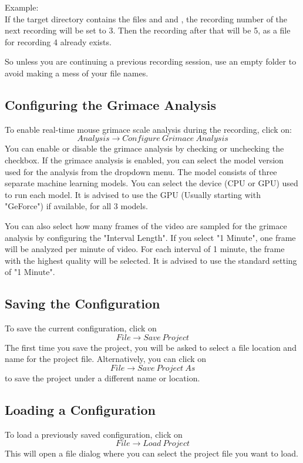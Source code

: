 Example:\\
If the target directory contains the files  and  and , 
the recording number of the next recording will be set to 3. Then the recording after that will be 5, 
as a file for recording 4 already exists.  

So unless you are continuing a previous recording session, 
use an empty folder to avoid making a mess of your file names.

\subsection{Configuring the Grimace Analysis} \label{configuring_the_grimace_analysis}
To enable real-time mouse grimace scale analysis during the recording, 
click on: \[Analysis \rightarrow Configure\ Grimace\ Analysis\] 
You can enable or disable the grimace analysis by checking or unchecking the checkbox.  
If the grimace analysis is enabled, you can select the model version used for the analysis from the dropdown menu.  
The model consists of three separate machine learning models.  
You can select the device (CPU or GPU) used to run each model.
It is advised to use the GPU (Usually starting with "GeForce") if available, for all 3 models.  

You can also select how many frames of the video are sampled for the grimace analysis by configuring the "Interval Length".
If you select "1 Minute", one frame will be analyzed per minute of video. 
For each interval of 1 minute, the frame with the highest quality will be selected.  
It is advised to use the standard setting of "1 Minute".

\subsection{Saving the Configuration}
To save the current configuration, click on \[File \rightarrow Save\ Project\]
The first time you save the project, you will be asked to select a file location and name for the project file.  
Alternatively, you can click on \[File \rightarrow Save\ Project\ As\] to save the project under a different name or location.

\subsection{Loading a Configuration}
To load a previously saved configuration, click on \[File \rightarrow Load\ Project\]
This will open a file dialog where you can select the project file you want to load.

